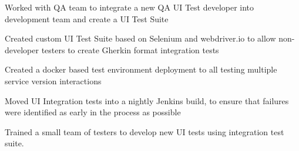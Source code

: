 \documentclass[11pt, a4paper]{awesomecv}
\begin{document}
\begin{cventries}
{\begin{cvitems}
                    \item{Worked with QA team to integrate a new QA UI Test developer into development team and create a UI Test Suite}
                    \item{Created custom UI Test Suite based on Selenium and webdriver.io to allow non-developer testers to create Gherkin format integration tests}
                    \item{Created a docker based test environment deployment to all testing multiple service version interactions}
                    \item{Moved UI Integration tests into a nightly Jenkins build, to ensure that failures were identified as early in the process as possible}
                    \item{Trained a small team of testers to develop new UI tests using integration test suite.}
          \end{cvitems}
    }
 

\end{cventries}
\end{document}
